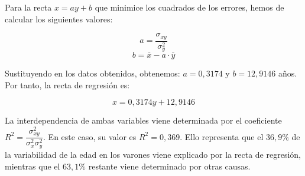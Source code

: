\documentclass{article}
\begin{document}
Para la recta $x = ay + b$ que minimice los cuadrados de los errores, hemos de calcular los siguientes valores:

$$a = \frac{\sigma_{xy}}{\sigma_y^2}$$
$$b = \overline{x} - a·\overline{y}$$

Sustituyendo en los datos obtenidos, obtenemos: $a=0,3174$ y $b=12,9146$ años. Por tanto, la recta de regresión es:

$$ x = 0,3174y + 12,9146 $$

La interdependencia de ambas variables viene determinada por el coeficiente $R^2 = \dfrac{\sigma_{xy}^2}{\sigma_x^2\sigma_y^2}$. En este caso, su valor es $R^2 = 0,369$. Ello representa que el $36,9 \%$ de la variabilidad de la edad en los varones viene explicado por la recta de regresión, mientras que el $63,1 \%$ restante viene determinado por otras causas. 
\end{document}
